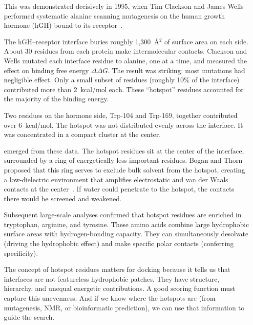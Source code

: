 This was demonstrated decisively in 1995, when Tim Clackson and James Wells performed systematic alanine scanning mutagenesis on the human growth hormone (hGH) bound to its receptor~\cite{clackson1995}.

The hGH--receptor interface buries roughly 1,300~\AA$^2$ of surface area on each side.
About 30 residues from each protein make intermolecular contacts.
Clackson and Wells mutated each interface residue to alanine, one at a time, and measured the effect on binding free energy $\Delta\Delta G$.
The result was striking: most mutations had negligible effect.
Only a small subset of residues (roughly 10\% of the interface) contributed more than 2~kcal/mol each.
These ``hotspot'' residues accounted for the majority of the binding energy.

Two residues on the hormone side, Trp-104 and Trp-169, together contributed over 6~kcal/mol.
The hotspot was not distributed evenly across the interface.
It was concentrated in a compact cluster at the center.

 emerged from these data.
The hotspot residues sit at the center of the interface, surrounded by a ring of energetically less important residues.
Bogan and Thorn proposed that this ring serves to exclude bulk solvent from the hotspot, creating a low-dielectric environment that amplifies electrostatic and van der Waals contacts at the center~\cite{bogan1998}.
If water could penetrate to the hotspot, the contacts there would be screened and weakened.

Subsequent large-scale analyses confirmed that hotspot residues are enriched in tryptophan, arginine, and tyrosine.
These amino acids combine large hydrophobic surface areas with hydrogen-bonding capacity.
They can simultaneously desolvate (driving the hydrophobic effect) and make specific polar contacts (conferring specificity).

The concept of hotspot residues matters for docking because it tells us that interfaces are not featureless hydrophobic patches.
They have structure, hierarchy, and unequal energetic contributions.
A good scoring function must capture this unevenness.
And if we know where the hotspots are (from mutagenesis, NMR, or bioinformatic prediction), we can use that information to guide the search.

